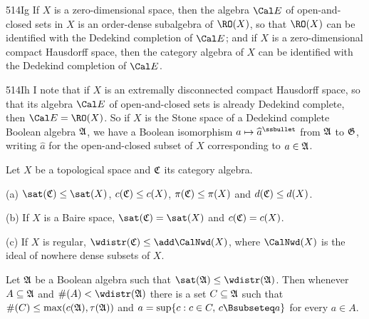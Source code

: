 \spheader 514Ig If $X$ is a zero-dimensional
space, then the algebra $\Cal E$ of open-and-closed sets in $X$ is
an order-dense subalgebra of $\RO(X)$, so that $\RO(X)$ can be identified
with the Dedekind completion of $\Cal E$;  and if $X$ is a
zero-dimensional compact Hausdorff space, then the category algebra of $X$
can be
identified with the Dedekind completion of $\Cal E$.

\spheader 514Ih I note that if $X$ is an extremally
disconnected compact Hausdorff space, so that its algebra $\Cal E$ of
open-and-closed sets is already Dedekind complete,
then $\Cal E=\RO(X)$.   So if $X$ is the Stone space of a Dedekind complete
Boolean algebra $\frak A$, we have a Boolean isomorphism
$a\mapsto\widehat{a}^{\ssbullet}$ from $\frak A$ to $\frak G$, writing
$\widehat{a}$ for the open-and-closed subset of $X$ corresponding to
$a\in\frak A$.

 Let $X$ be a topological space and $\frak C$
its category algebra.

(a) $\sat(\frak C)\le\sat(X)$, $c(\frak C)\le c(X)$,
$\pi(\frak C)\le\pi(X)$ and $d(\frak C)\le d(X)$.

(b) If $X$ is a Baire space, $\sat(\frak C)=\sat(X)$ and
$c(\frak C)=c(X)$.

(c) If $X$ is regular, $\wdistr(\frak C)\le\add\CalNwd(X)$, where
$\CalNwd(X)$ is the ideal of nowhere dense subsets of $X$.


 Let $\frak A$ be a Boolean algebra such that
$\sat(\frak A)\le\wdistr(\frak A)$.   Then whenever $A\subseteq\frak A$
and $\#(A)<\wdistr(\frak A)$ there is a set $C\subseteq\frak A$ such
that $\#(C)\le\max(c(\frak A),\tau(\frak A))$ and
$a=\sup\{c:c\in C,\,c\Bsubseteq a\}$ for every $a\in A$.


